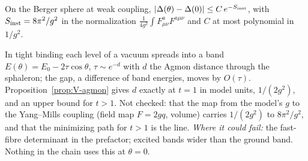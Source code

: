\begin{conjecture}\label{conj:V-theta}
On the Berger sphere at weak coupling, $|\Delta(\theta)-\Delta(0)|\leq C\,e^{-S_{\rm inst}}$, with
$S_{\rm inst}=8\pi^2/g^2$ in the normalization $\frac1{4g^2}\int F^a_{\mu\nu}F^{a\mu\nu}$ and $C$ at most polynomial
in $1/g^2$.
\end{conjecture}
\begin{sketch}
In tight binding each level of a vacuum spreads into a band $E(\theta)=E_0-2\tau\cos\theta$,
$\tau\sim e^{-d}$ with $d$ the Agmon distance through the sphaleron; the gap, a difference of band energies, moves by
$O(\tau)$. Proposition~\ref{prop:V-agmon}
gives $d$ exactly at $t=1$ in model units, $1/(2g^2)$, and an upper bound for $t>1$. Not checked: that the map from the model's $g$ to
the Yang--Mills coupling (field map $F=2gq$, volume) carries $1/(2g^2)$ to $8\pi^2/g^2$, and that the minimizing path
for $t>1$ is the line. \emph{Where it could fail:} the fast-fibre determinant in the prefactor; excited bands wider
than the ground band. Nothing in the chain uses this at $\theta=0$.
\end{sketch}

\medskip{}


